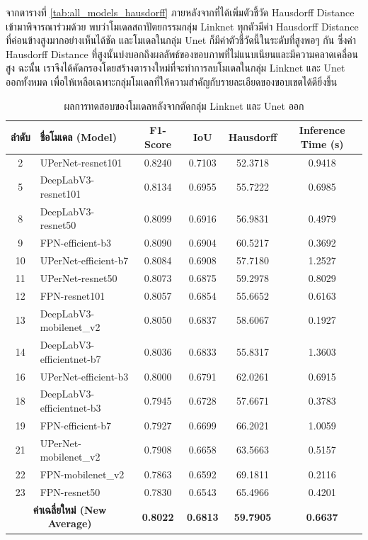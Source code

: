 จากตารางที่ \ref{tab:all_models_hausdorff} ภายหลังจากที่ได้เพิ่มตัวชี้วัด Hausdorff Distance เข้ามาพิจารณาร่วมด้วย พบว่าโมเดลสถาปัตยกรรมกลุ่ม Linknet ทุกตัวมีค่า Hausdorff Distance ที่ค่อนข้างสูงมากอย่างเห็นได้ชัด และโมเดลในกลุ่ม Unet ก็มีค่าตัวชี้วัดนี้ในระดับที่สูงพอๆ กัน ซึ่งค่า Hausdorff Distance ที่สูงนั้นบ่งบอกถึงผลลัพธ์ของขอบภาพที่ไม่แนบเนียนและมีความคลาดเคลื่อนสูง ฉะนั้น เราจึงได้คัดกรองโดยสร้างตารางใหม่ที่จะทำการลบโมเดลในกลุ่ม Linknet และ Unet ออกทั้งหมด เพื่อให้เหลือเฉพาะกลุ่มโมเดลที่ให้ความสำคัญกับรายละเอียดของขอบเขตได้ดียิ่งขึ้น



\begin{table}[hbt!]
\centering
\caption{ผลการทดสอบของโมเดลหลังจากตัดกลุ่ม Linknet และ Unet ออก}
\label{tab:filtered_models_no_linknet_unet}
\begin{tabular}{|c|l|c|c|c|c|}
\hline
\textbf{ลำดับ} & \textbf{ชื่อโมเดล (Model)} & \textbf{F1-Score} & \textbf{IoU} & \textbf{Hausdorff} & \textbf{Inference Time (s)} \\
\hline
2 & UPerNet-resnet101 & 0.8240 & 0.7103 & 52.3718 & 0.9418 \\
5 & DeepLabV3-resnet101 & 0.8134 & 0.6955 & 55.7222 & 0.6985 \\
8 & DeepLabV3-resnet50 & 0.8099 & 0.6916 & 56.9831 & 0.4979 \\
9 & FPN-efficient-b3 & 0.8090 & 0.6904 & 60.5217 & 0.3692 \\
10 & UPerNet-efficient-b7 & 0.8084 & 0.6908 & 57.7180 & 1.2527 \\
11 & UPerNet-resnet50 & 0.8073 & 0.6875 & 59.2978 & 0.8029 \\
12 & FPN-resnet101 & 0.8057 & 0.6854 & 55.6652 & 0.6163 \\
13 & DeepLabV3-mobilenet\_v2 & 0.8050 & 0.6837 & 58.6067 & 0.1927 \\
14 & DeepLabV3-efficientnet-b7 & 0.8036 & 0.6833 & 55.8317 & 1.3603 \\
16 & UPerNet-efficient-b3 & 0.8000 & 0.6791 & 62.0261 & 0.6915 \\
18 & DeepLabV3-efficientnet-b3 & 0.7945 & 0.6728 & 57.6671 & 0.3783 \\
19 & FPN-efficient-b7 & 0.7927 & 0.6699 & 66.2021 & 1.0059 \\
21 & UPerNet-mobilenet\_v2 & 0.7908 & 0.6658 & 63.5663 & 0.5157 \\
22 & FPN-mobilenet\_v2 & 0.7863 & 0.6592 & 69.1811 & 0.2116 \\
23 & FPN-resnet50 & 0.7830 & 0.6543 & 65.4966 & 0.4201 \\
\hline
\multicolumn{2}{|c|}{\textbf{ค่าเฉลี่ยใหม่ (New Average)}} & \textbf{0.8022} & \textbf{0.6813} & \textbf{59.7905} & \textbf{0.6637} \\
\hline
\end{tabular}
\end{table}

